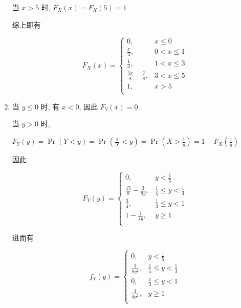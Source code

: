 \documentclass[answers]{exam}  %
\begin{document}
\begin{questions}
\begin{solution}
\begin{enumerate}
            当 $x > 5$ 时, $\displaystyle F_{X}(x) = F_{X}(5) = 1$

            综上即有

            \begin{equation}
              F_{X}(x) =
              \begin{cases}
                0,                          & x\le 0      \\
                \frac{x}{4},                & 0 < x \le 1 \\
                \frac{1}{4},                & 1 < x \le 3 \\
                \frac{3x}{8} - \frac{7}{8}, & 3 < x \le 5 \\
                1,                          & x > 5       \\
              \end{cases}
            \end{equation}

      \item 当 $y \le 0$ 时, 有 $x < 0$, 因此 $F_{Y}(x) = 0$

            当 $y > 0$ 时,

            $F_{Y}(y) = \operatorname{Pr}(Y < y) = \operatorname{Pr}(\frac{1}{X} < y) = \operatorname{Pr}(X > \frac{1}{y}) = 1 - F_{X}(\frac{1}{y})$

            因此

            \begin{equation}
              F_{Y}(y) =
              \begin{cases}
                0,                         & y < \frac{1}{5}                 \\
                \frac{15}{8}-\frac{3}{8y}, & \frac{1}{5} \le y < \frac{1}{3} \\
                \frac{3}{4},               & \frac{1}{3} \le y < 1           \\
                1 - \frac{1}{4y},          & y \ge 1                         \\
              \end{cases}
            \end{equation}

            进而有

            \begin{equation}
              f_{Y}(y) =
              \begin{cases}
                0,                 & y < \frac{1}{5}                 \\
                \frac{3}{8 y^{2}}, & \frac{1}{5} \le y < \frac{1}{3} \\
                0,                 & \frac{1}{3} \le y < 1           \\
                \frac{1}{4 y^{2}}, & y \ge 1                         \\
              \end{cases}
            \end{equation}


\end{enumerate}
\end{solution}
\end{questions}
\end{document}

